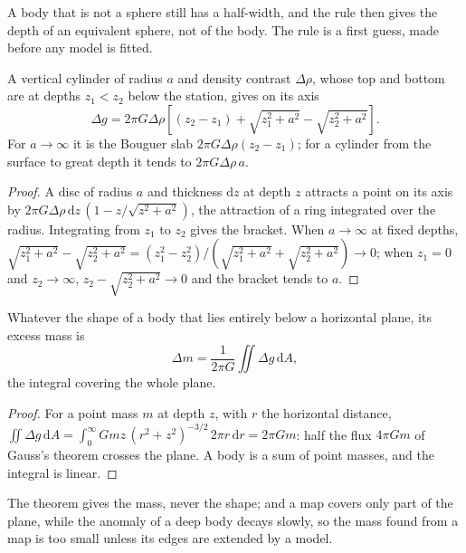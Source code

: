 A body that is not a sphere still has a half-width, and the rule then
gives the depth of an equivalent sphere, not of the body. The rule is
a first guess, made before any model is fitted.

\begin{proposition}\label{prop:b3:field-lab-methods-3:vcyl}
A vertical cylinder of radius $a$ and density contrast $\Delta\rho$,
whose top and bottom are at depths $z_1 < z_2$ below the station,
gives on its axis
\[
\Delta g = 2\pi G\Delta\rho\left[(z_2 - z_1) + \sqrt{z_1^2 + a^2}
           - \sqrt{z_2^2 + a^2}\right] .
\]
For $a \to \infty$ it is the Bouguer slab $2\pi G\Delta\rho(z_2 - z_1)$;
for a cylinder from the surface to great depth it tends to
$2\pi G\Delta\rho\,a$.
\end{proposition}

\begin{proof}
A disc of radius $a$ and thickness $\mathrm{d}z$ at depth $z$ attracts
a point on its axis by $2\pi G\Delta\rho\,\mathrm{d}z\,(1 -
z/\sqrt{z^2 + a^2})$, the attraction of a ring integrated over the
radius. Integrating from $z_1$ to $z_2$ gives the bracket. When $a \to
\infty$ at fixed depths, $\sqrt{z_1^2 + a^2} - \sqrt{z_2^2 + a^2} =
(z_1^2 - z_2^2)/(\sqrt{z_1^2 + a^2} + \sqrt{z_2^2 + a^2}) \to 0$; when
$z_1 = 0$ and $z_2 \to \infty$, $z_2 - \sqrt{z_2^2 + a^2} \to 0$ and
the bracket tends to $a$.
\end{proof}

\begin{proposition}\label{prop:b3:field-lab-methods-3:gauss}
Whatever the shape of a body that lies entirely below a horizontal
plane, its excess mass is
\[
\Delta m = \frac{1}{2\pi G}\iint \Delta g\,\mathrm{d}A ,
\]
the integral covering the whole plane.
\end{proposition}

\begin{proof}
For a point mass $m$ at depth $z$, with $r$ the horizontal distance,
$\iint \Delta g\,\mathrm{d}A = \int_0^\infty
Gmz\,(r^2 + z^2)^{-3/2}\,2\pi r\,\mathrm{d}r = 2\pi Gm$: half the flux
$4\pi Gm$ of Gauss's theorem crosses the plane. A body is a sum of point
masses, and the integral is linear.
\end{proof}

The theorem gives the mass, never the shape; and a map covers only part
of the plane, while the anomaly of a deep body decays slowly, so the
mass found from a map is too small unless its edges are extended by a
model.

